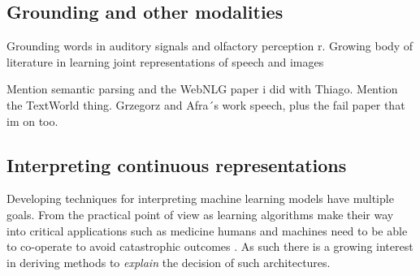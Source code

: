 \subsection{Grounding and other modalities}
Grounding words in auditory signals \cite{kiela2015multi,lopopolo2015sound} and
 olfactory perception \cite{kiela2015grounding}r. Growing body of literature in learning joint representations
 of speech and images \cite{harwath2016unsupervised,chrupala2017representations,harwath2018jointly}


Mention semantic parsing and the WebNLG paper i did with Thiago. Mention the TextWorld thing. Grzegorz
and Afra´s work speech, plus the fail paper that im on too.

\subsection{Interpreting continuous representations}
\label{sec:interpret}
Developing techniques for interpreting machine learning models have multiple goals. From the practical point of view as learning algorithms
make their way into critical applications such as medicine humans and machines need to be able to co-operate to avoid catastrophic outcomes \cite{caruana2015intelligible}.
As such there is a growing interest in deriving methods to \emph{explain} the decision of such architectures.


